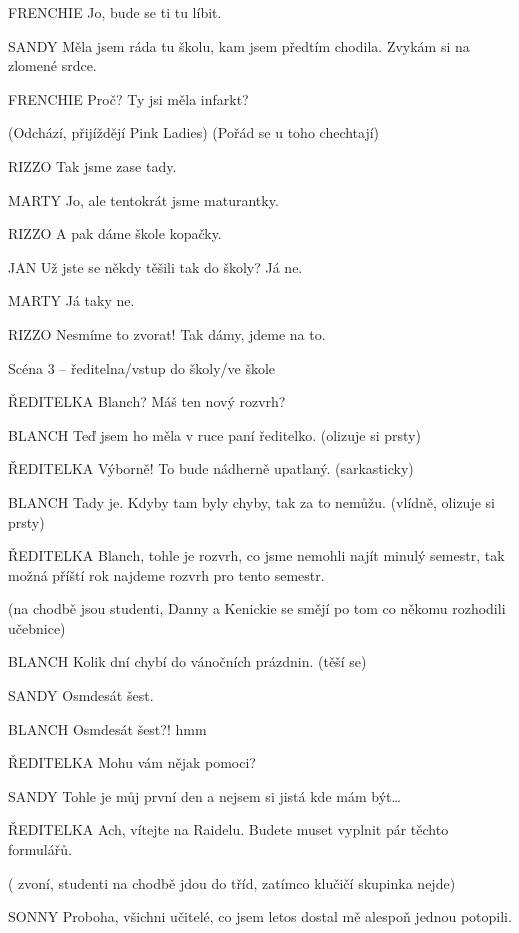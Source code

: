 FRENCHIE                Jo, bude se ti tu líbit.

SANDY                Měla jsem ráda tu školu, kam jsem předtím chodila. Zvykám si na                         zlomené srdce.

FRENCHIE                Proč? Ty jsi měla infarkt?

(Odchází, přijíždějí Pink Ladies) (Pořád se u toho chechtají)

RIZZO                Tak jsme zase tady.

MARTY                Jo, ale tentokrát jsme maturantky.

RIZZO                A pak dáme škole kopačky.

JAN                Už jste se někdy těšili tak do školy? Já ne.

MARTY                Já taky ne.

RIZZO                Nesmíme to zvorat! Tak dámy, jdeme na to.

Scéna 3 – ředitelna/vstup do školy/ve škole 

ŘEDITELKA                Blanch? Máš ten nový rozvrh?

BLANCH                 Teď jsem ho měla v ruce paní ředitelko. (olizuje si prsty)

ŘEDITELKA                 Výborně! To bude nádherně upatlaný. (sarkasticky)

BLANCH                Tady je. Kdyby tam byly chyby, tak za to nemůžu. (vlídně, olizuje si prsty)

ŘEDITELKA                Blanch, tohle je rozvrh, co jsme nemohli najít minulý semestr, tak                         možná příští rok najdeme rozvrh pro tento semestr.

(na chodbě jsou studenti, Danny a Kenickie se smějí po tom co někomu rozhodili učebnice)

BLANCH        Kolik dní chybí do vánočních prázdnin. (těší se)

SANDY        Osmdesát šest.

BLANCH        Osmdesát šest?! hmm

ŘEDITELKA        Mohu vám nějak pomoci?

SANDY        Tohle je můj první den a nejsem si jistá kde mám být…

ŘEDITELKA        Ach, vítejte na Raidelu. Budete muset vyplnit pár těchto formulářů.        

( zvoní, studenti na chodbě jdou do tříd, zatímco klučičí skupinka nejde)

SONNY         Proboha, všichni učitelé, co jsem letos dostal mě alespoň jednou potopili.

